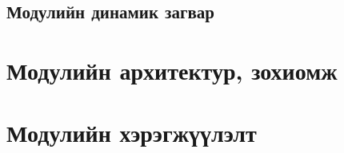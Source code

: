 \subsection{Модулийн динамик загвар}



\section{Модулийн архитектур, зохиомж}

\section{Модулийн хэрэгжүүлэлт}
